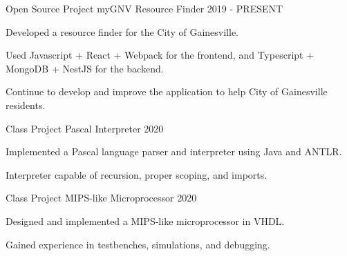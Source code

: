 

\begin{cventries}

\cventry
    {Open Source Project} %
    {myGNV Resource Finder} %
    {} %
    {2019 - PRESENT} %
    {
    \begin{cvitems} %
        \item {Developed a resource finder for the City of Gainesville.}
        \item {Used Javascript + React + Webpack for the frontend, and Typescript + MongoDB + NestJS for the backend.}
        \item {Continue to develop and improve the application to help City of Gainesville residents.}
    \end{cvitems}
    }


\cventry
{Class Project} %
{Pascal Interpreter} %
{} %
{2020} %
{
  \begin{cvitems} %
    \item {Implemented a Pascal language parser and interpreter using Java and ANTLR.}
    \item {Interpreter capable of recursion, proper scoping, and imports.}
  \end{cvitems}
}


\cventry
{Class Project} %
{MIPS-like Microprocessor} %
{} %
{2020} %
{
  \begin{cvitems} %
    \item {Designed and implemented a MIPS-like microprocessor in VHDL.}
    \item {Gained experience in testbenches, simulations, and debugging.}
  \end{cvitems}
}


\end{cventries}
